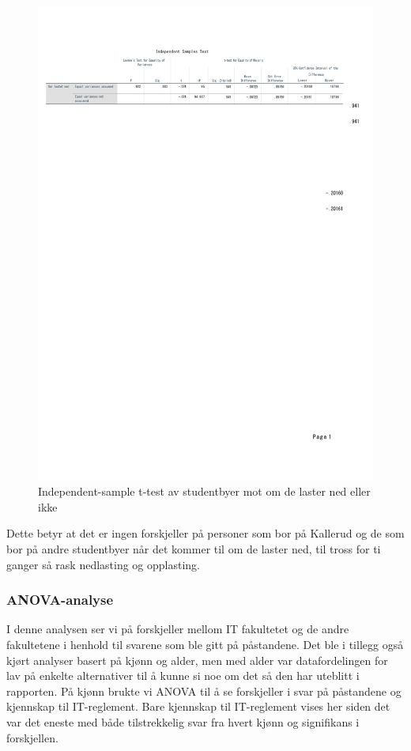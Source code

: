 \begin{figure}[H]
    \centering
    \includegraphics[scale=0.7]{case_1/bilder/studentby_lasterned_ttest.pdf}
    \caption[T-test av studentbyer mot om de laster ned eller ikke]{Independent-sample t-test av studentbyer mot om de laster ned eller ikke}
    \label{fig:case1-studby_lasterned_ttest}
\end{figure}

Dette betyr at det er ingen forskjeller på personer som bor på Kallerud og de som bor på andre studentbyer når det kommer til om de laster ned, til tross for ti ganger så rask nedlasting og opplasting. 

\subsubsection{ANOVA-analyse}
I denne analysen ser vi på forskjeller mellom IT fakultetet og de andre fakultetene i henhold til svarene som ble gitt på påstandene. Det ble i tillegg også kjørt analyser basert på kjønn og alder, men med alder var datafordelingen for lav på enkelte alternativer til å kunne si noe om det så den har uteblitt i rapporten. På kjønn brukte vi ANOVA til å se forskjeller i svar på påstandene og kjennskap til IT-reglement. Bare kjennskap til IT-reglement vises her siden det var det eneste med både tilstrekkelig svar fra hvert kjønn og signifikans i forskjellen.

